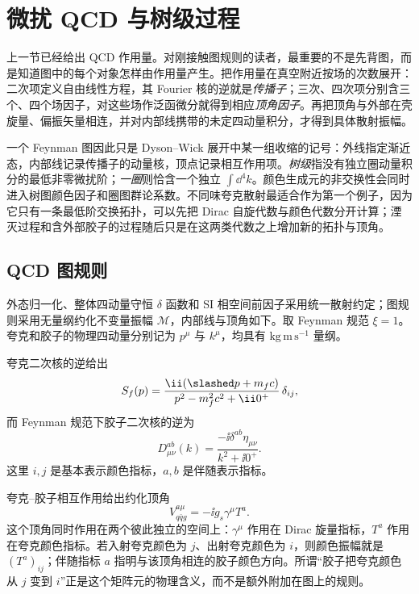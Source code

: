 \section{微扰 QCD 与树级过程}\label{sec:qcd-tree-processes-dp10}

上一节已经给出 QCD 作用量。对刚接触图规则的读者，最重要的不是先背图，而是知道图中的每个对象怎样由作用量产生。把作用量在真空附近按场的次数展开：二次项定义自由线性方程，其 Fourier 核的逆就是\emph{传播子}；三次、四次项分别含三个、四个场因子，对这些场作泛函微分就得到相应\emph{顶角因子}。再把顶角与外部在壳旋量、偏振矢量相连，并对内部线携带的未定四动量积分，才得到具体散射振幅。

一个 Feynman 图因此只是 Dyson--Wick 展开中某一组收缩的记号：外线指定渐近态，内部线记录传播子的动量核，顶点记录相互作用项。\emph{树级}指没有独立圈动量积分的最低非零微扰阶；\emph{一圈}则恰含一个独立 $\int\dd^4k$。颜色生成元的非交换性会同时进入树图颜色因子和圈图群论系数。不同味夸克散射最适合作为第一个例子，因为它只有一条最低阶交换拓扑，可以先把 Dirac 自旋代数与颜色代数分开计算；湮灭过程和含外部胶子的过程随后只是在这两类代数之上增加新的拓扑与顶角。

\subsection{QCD 图规则}

外态归一化、整体四动量守恒 $\delta$ 函数和 SI 相空间前因子采用统一散射约定；图规则采用无量纲约化不变量振幅 $\mathcal M$，内部线与顶角如下。取 Feynman 规范 $\xi=1$。夸克和胶子的物理四动量分别记为 $p^\mu$ 与 $k^\mu$，均具有 $\mathrm{kg\,m\,s^{-1}}$ 量纲。

夸克二次核的逆给出
\begin{equation}
 {
 S_f(p)
 =\frac{\ii(\slashed p+m_fc)}{p^2-m_f^2c^2+\ii0^+}\,\delta_{ij},}
 \label{eq:qcd-quark-propagator-dp10}
\end{equation}
而 Feynman 规范下胶子二次核的逆为
\begin{equation}
 {
 D_{\mu\nu}^{ab}(k)
 =\frac{-\ii\delta^{ab}\eta_{\mu\nu}}
 {k^2+\ii0^+}.}
 \label{eq:qcd-gluon-propagator-dp10}
\end{equation}
这里 $i,j$ 是基本表示颜色指标，$a,b$ 是伴随表示指标。

夸克--胶子相互作用给出约化顶角
\begin{equation}
 {
 V_{q\bar q g}^{a\mu}=-\ii g_s\gamma^\mu T^a.}
 \label{eq:qcd-quark-gluon-vertex-dp10}
\end{equation}
这个顶角同时作用在两个彼此独立的空间上：$\gamma^\mu$ 作用在 Dirac 旋量指标，$T^a$ 作用在夸克颜色指标。若入射夸克颜色为 $j$、出射夸克颜色为 $i$，则颜色振幅就是 $(T^a)_{ij}$；伴随指标 $a$ 指明与该顶角相连的胶子颜色方向。所谓“胶子把夸克颜色从 $j$ 变到 $i$”正是这个矩阵元的物理含义，而不是额外附加在图上的规则。


